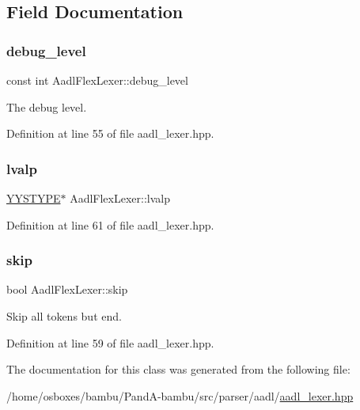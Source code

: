 \subsection{Field Documentation}
\mbox{\label{classAadlFlexLexer_ac360f0662222ee76aed9cabbc138ca5f}} 
\subsubsection{\texorpdfstring{debug\+\_\+level}{debug\_level}}
{\footnotesize\ttfamily const int Aadl\+Flex\+Lexer\+::debug\+\_\+level\hspace{0.3cm}{\ttfamily [protected]}}



The debug level. 



Definition at line 55 of file aadl\+\_\+lexer.\+hpp.

\mbox{\label{classAadlFlexLexer_abf8dd2daa7b628814ac164d13b15077f}} 
\subsubsection{\texorpdfstring{lvalp}{lvalp}}
{\footnotesize\ttfamily \hyperlink{asn__parser_8cpp_a2ceb5b985e149f18e018b142cfdd7264}{Y\+Y\+S\+T\+Y\+PE}$\ast$ Aadl\+Flex\+Lexer\+::lvalp}



Definition at line 61 of file aadl\+\_\+lexer.\+hpp.

\mbox{\label{classAadlFlexLexer_aed96291a7753184f16037abfea6bf1ec}} 
\subsubsection{\texorpdfstring{skip}{skip}}
{\footnotesize\ttfamily bool Aadl\+Flex\+Lexer\+::skip}



Skip all tokens but end. 



Definition at line 59 of file aadl\+\_\+lexer.\+hpp.



The documentation for this class was generated from the following file\+:\begin{DoxyCompactItemize}
\item 
/home/osboxes/bambu/\+Pand\+A-\/bambu/src/parser/aadl/\hyperlink{aadl__lexer_8hpp}{aadl\+\_\+lexer.\+hpp}\end{DoxyCompactItemize}
